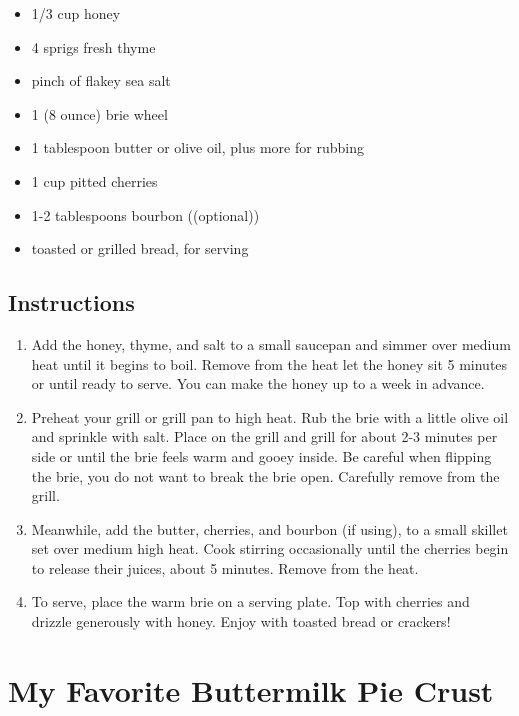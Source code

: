\documentclass[
  letterpaper,
  DIV=11,
  numbers=noendperiod,
  titlepage=false]{scrreprt}
\providecommand{\tightlist}{%
  \setlength{\itemsep}{0pt}\setlength{\parskip}{0pt}}\usepackage{longtable,booktabs,array}
\begin{document}
\begin{itemize}
\tightlist
\item
  1/3 cup honey
\item
  4 sprigs fresh thyme
\item
  pinch of flakey sea salt
\item
  1 (8 ounce) brie wheel
\item
  1 tablespoon butter or olive oil, plus more for rubbing
\item
  1 cup pitted cherries
\item
  1-2 tablespoons bourbon ((optional))
\item
  toasted or grilled bread, for serving
\end{itemize}

\section{Instructions}\label{instructions-78}

\begin{enumerate}
\def\labelenumi{\arabic{enumi}.}
\tightlist
\item
  Add the honey, thyme, and salt to a small saucepan and simmer over
  medium heat until it begins to boil. Remove from the heat let the
  honey sit 5 minutes or until ready to serve. You can make the honey up
  to a week in advance.
\item
  Preheat your grill or grill pan to high heat. Rub the brie with a
  little olive oil and sprinkle with salt. Place on the grill and grill
  for about 2-3 minutes per side or until the brie feels warm and gooey
  inside. Be careful when flipping the brie, you do not want to break
  the brie open. Carefully remove from the grill.
\item
  Meanwhile, add the butter, cherries, and bourbon (if using), to a
  small skillet set over medium high heat. Cook stirring occasionally
  until the cherries begin to release their juices, about 5 minutes.
  Remove from the heat.
\item
  To serve, place the warm brie on a serving plate. Top with cherries
  and drizzle generously with honey. Enjoy with toasted bread or
  crackers!
\end{enumerate}


\chapter{My Favorite Buttermilk Pie
Crust}\label{my-favorite-buttermilk-pie-crust}
\end{document}
